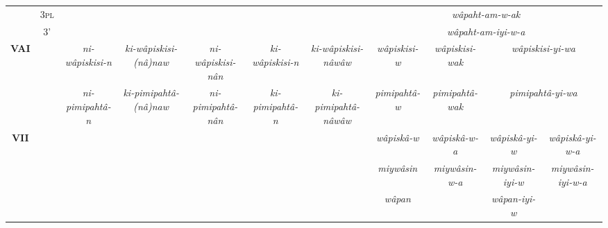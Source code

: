\documentclass[twoside,a4paper,11pt]{article}
\newcommand{\ipa}[1]{{\phon\textit{#1}}}
\newcommand{\pl}{\textsc{pl}}
\newcommand{\grise}[1]{\cellcolor{lightgray}\textbf{#1}}
\begin{document}
\begin{landscape}
\begin{table}[H]
{\begin{tabular}{ccccccccccc}
& 3\pl   & \grise{} & \grise{} & \grise{}  & \grise{}  & \grise{}  & \multicolumn{4}{c}{\ipa{wâpaht-am-w-ak} }  \\ 
& 3'  &\grise{}  & \grise{}  & \grise{}  &\grise{}  &  \grise{}  &\multicolumn{4}{c}{\ipa{wâpaht-am-iyi-w-a} }\\ 
\bottomrule
\multirow{2}{*}{\textbf{VAI}} &  & \ipa{ni-wâpiskisi-n} & \ipa{ ki-wâpiskisi-(nâ)naw} & \ipa{ni-wâpiskisi-nân} &\ipa{ki-wâpiskisi-n} &\ipa{ ki-wâpiskisi-nâwâw} & \ipa{wâpiskisi-w} & \ipa{wâpiskisi-wak} & \multicolumn{2}{c}{\ipa{wâpiskisi-yi-wa}} \\
&  & \ipa{ni-pimipahtâ-n} & \ipa{ ki-pimipahtâ-(nâ)naw} & \ipa{ni-pimipahtâ-nân} &\ipa{ki-pimipahtâ-n} &\ipa{ ki-pimipahtâ-nâwâw} & \ipa{pimipahtâ-w} & \ipa{pimipahtâ-wak} & \multicolumn{2}{c}{\ipa{pimipahtâ-yi-wa}} \\
\bottomrule
\multirow{2}{*}{\textbf{VII}} &  &  \grise{}  &  \grise{}  &  \grise{} & \grise{}  & \grise{}  & \ipa{wâpiskâ-w} & \ipa{wâpiskâ-w-a} & \ipa{wâpiskâ-yi-w} & \ipa{wâpiskâ-yi-w-a}\\
  & &  \grise{}  &  \grise{}  &  \grise{} & \grise{}  & \grise{}  & \ipa{miywâsin} & \ipa{miywâsin-w-a} & \ipa{miywâsin-iyi-w} & \ipa{miywâsin-iyi-w-a}\\
 & &  \grise{}  &  \grise{}  &  \grise{} & \grise{}  & \grise{}  & \ipa{wâpan} &\grise{} & \ipa{wâpan-iyi-w} & \grise{}\\
\bottomrule
\end{tabular}}
\end{table}


\end{landscape}
\end{document}
